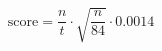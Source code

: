 \documentclass{article}
\begin{document}
\begin{equation*}
\text{score} =  \frac{n}{t} \cdot \sqrt{\frac{n}{84}} \cdot 0.0014 
\end{equation*}
\end{document}
